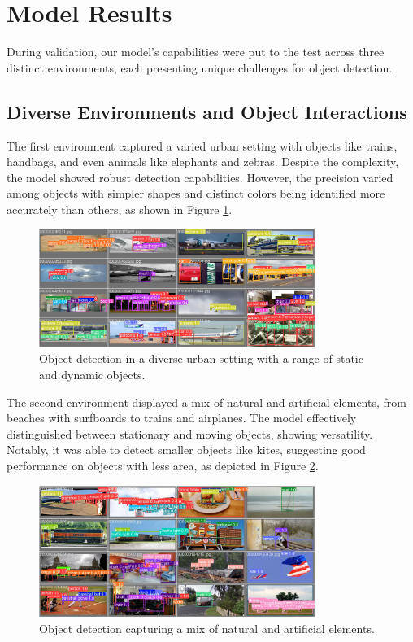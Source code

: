 \documentclass[10pt]{extarticle}
\begin{document}
\section{Model Results}

During validation, our model's capabilities were put to the test across three distinct environments, each presenting unique challenges for object detection.

\subsection{Diverse Environments and Object Interactions}

The first environment captured a varied urban setting with objects like trains, handbags, and even animals like elephants and zebras. Despite the complexity, the model showed robust detection capabilities. However, the precision varied among objects with simpler shapes and distinct colors being identified more accurately than others, as shown in Figure \ref{fig:urban_setting}.

\begin{figure}[H]
\centering
\includegraphics[width=0.8\textwidth]{images/val_batch0_pred.jpg}
\caption{Object detection in a diverse urban setting with a range of static and dynamic objects.}
\label{fig:urban_setting}
\end{figure}

The second environment displayed a mix of natural and artificial elements, from beaches with surfboards to trains and airplanes. The model effectively distinguished between stationary and moving objects, showing versatility. Notably, it was able to detect smaller objects like kites, suggesting good performance on objects with less area, as depicted in Figure \ref{fig:natural_artificial}.

\begin{figure}[H]
\centering
\includegraphics[width=0.8\textwidth]{images/val_batch1_pred.jpg}
\caption{Object detection capturing a mix of natural and artificial elements.}
\label{fig:natural_artificial}
\end{figure}
\end{document}
